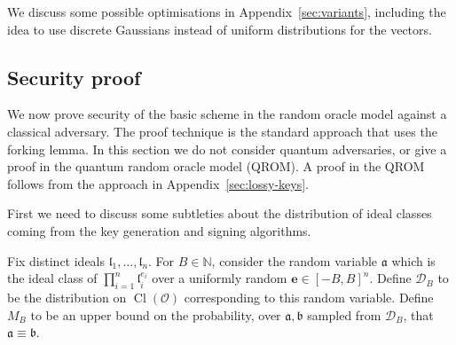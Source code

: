 \documentclass{llncs}
\newcommand{\D}{\mathcal{D}}
\newcommand{\N}{\mathbb{N}}
\newcommand{\OO}{\mathcal{O}}
\DeclareMathOperator{\Cl}{Cl}
\renewcommand{\a}{\mathfrak{a}}
\renewcommand{\b}{\mathfrak{b}}
\renewcommand{\l}{\mathfrak{l}}
\newcommand{\e}{\mathbf{e}}
\begin{document}
We discuss some possible optimisations in Appendix~\ref{sec:variants}, including the idea to use discrete Gaussians instead of uniform distributions for the vectors.


%
%
%






\subsection{Security proof}
\label{sec:security-proof}

We now prove security of the basic scheme in the random oracle model against a classical adversary. 
The proof technique is the standard approach that uses the forking lemma.
In this section we do not consider quantum adversaries, or give a proof in the quantum random oracle model (QROM).
A proof in the QROM follows from the approach in Appendix~\ref{sec:lossy-keys}.

First we need to discuss some subtleties about the distribution of ideal classes coming from the key generation and signing algorithms.

\begin{definition} \label{defn:sampling-distributions}
Fix distinct ideals $\l_1, \dots, \l_n$.
For $B \in \N$, consider the random variable $\a$ which is the ideal class of $\prod_{i=1}^n \l_i^{e_i}$ over a uniformly random $\e \in [-B,B]^n$.
Define $\D_B$ to be the distribution on $\Cl( \OO )$ corresponding to this random variable.
%
Define $M_B$ to be an upper bound on the probability, over $\a, \b$ sampled from $\D_B$, that $\a \equiv \b$.
\end{definition}
\end{document}
